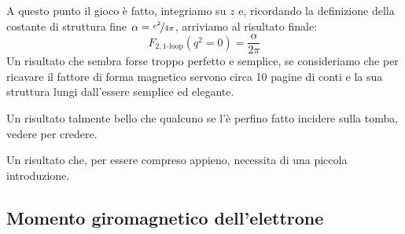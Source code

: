 \documentclass[../main.tex]{subfiles}
\begin{document}
A questo punto il gioco è fatto, integriamo su $z$ e, ricordando la definizione della costante di struttura fine $\alpha = \nicefrac{e^2}{4\pi}$, arriviamo al risultato finale:
\begin{equation}
    \boxed{F_{2,\text{1-loop}}(q^2=0) = \frac{\alpha}{2\pi}}
    \label{eq:F2_q0}
\end{equation}
Un risultato che sembra forse troppo perfetto e semplice, se consideriamo che per ricavare il fattore di forma magnetico servono circa 10 pagine di conti e la sua struttura lungi dall'essere semplice ed elegante. 

Un risultato talmente bello che qualcuno se l'è perfino fatto incidere sulla tomba, vedere per credere.

Un risultato che, per essere compreso appieno, necessita di una piccola introduzione.

\subsection{Momento giromagnetico dell'elettrone}
\end{document}
